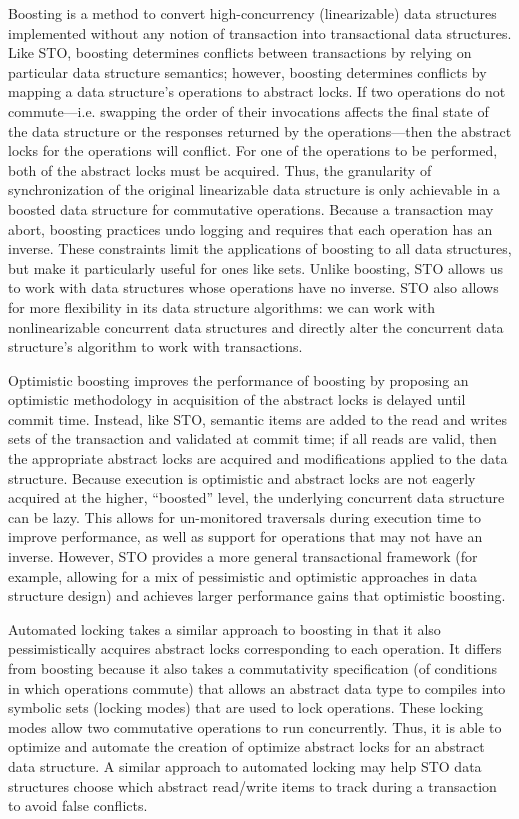 Boosting\cite{boost} is a method to convert high-concurrency (linearizable) data structures implemented without any notion of transaction into transactional data structures. Like STO, boosting determines conflicts between transactions by relying on particular data structure semantics; however, boosting determines conflicts by mapping a data structure's operations to abstract locks. If two operations do not commute---i.e. swapping the order of their invocations affects the final state of the data structure or the responses returned by the operations---then the abstract locks for the operations will conflict. For one of the operations to be performed, both of the abstract locks must be acquired. Thus, the granularity of synchronization of the original linearizable data structure is only achievable in a boosted data structure for commutative operations. Because a transaction may abort, boosting practices undo logging and requires that each operation has an inverse. These constraints limit the applications of boosting to all data structures, but make it particularly useful for ones like sets. Unlike boosting, STO allows us to work with data structures whose operations have no inverse. STO also allows for more flexibility in its data structure algorithms: we can work with nonlinearizable concurrent data structures and directly alter the concurrent data structure's algorithm to work with transactions.

Optimistic boosting\cite{optboost} improves the performance of boosting by proposing an optimistic methodology in acquisition of the abstract locks is delayed until commit time. Instead, like STO, semantic items are added to the read and writes sets of the transaction and validated at commit time; if all reads are valid, then the appropriate abstract locks are acquired and modifications applied to the data structure. Because execution is optimistic and abstract locks are not eagerly acquired at the higher, ``boosted'' level, the underlying concurrent data structure can be lazy. This allows for un-monitored traversals during execution time to improve performance, as well as support for operations that may not have an inverse. However, STO provides a more general transactional framework (for example, allowing for a mix of pessimistic and optimistic approaches in data structure design) and achieves larger performance gains that optimistic boosting. 

Automated locking\cite{autolock} takes a similar approach to boosting in that it also pessimistically acquires abstract locks corresponding to each operation. It differs from boosting because it also takes a commutativity specification (of conditions in which operations commute) that allows an abstract data type to compiles into symbolic sets (locking modes) that are used to lock operations. These locking modes allow two commutative operations to run concurrently. Thus, it is able to optimize and automate the creation of optimize abstract locks for an abstract data structure. A similar approach to automated locking may help STO data structures choose which abstract read/write items to track during a transaction to avoid false conflicts.

